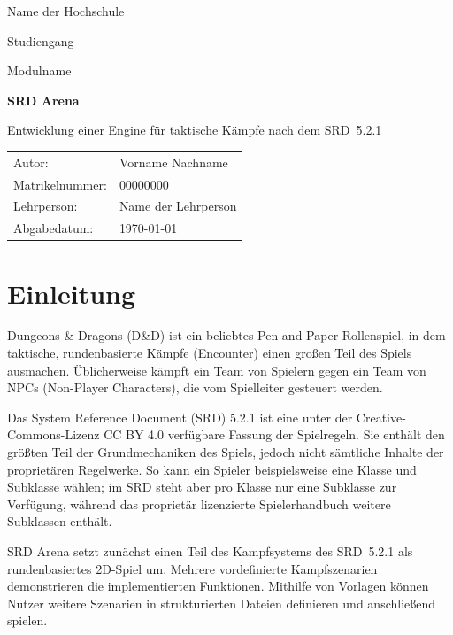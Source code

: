 \documentclass[
  12pt,
  a4paper,
  oneside,
  parskip=half,
  headings=normal
]{scrreprt}
\newcommand{\titel}{SRD Arena}
\newcommand{\untertitel}{Entwicklung einer Engine für taktische Kämpfe nach dem SRD~5.2.1}
\newcommand{\autor}{Vorname Nachname}
\newcommand{\matrikelnummer}{00000000}
\newcommand{\studiengang}{Studiengang}
\newcommand{\modul}{Modulname}
\newcommand{\dozent}{Name der Lehrperson}
\newcommand{\hochschule}{Name der Hochschule}
\newcommand{\abgabedatum}{\today}
\begin{document}
\begin{titlepage}
  \centering
  {\Large \hochschule\par}
  \vspace{1.5cm}
  {\large \studiengang\par}
  {\large \modul\par}
  \vfill
  {\Huge\bfseries \titel\par}
  \vspace{0.5cm}
  {\Large \untertitel\par}
  \vfill
  \begin{tabular}{ll}
    Autor: & \autor \\
    Matrikelnummer: & \matrikelnummer \\
    Lehrperson: & \dozent \\
    Abgabedatum: & \abgabedatum
  \end{tabular}
  \vfill
\end{titlepage}

\tableofcontents
\clearpage
{}

\chapter{Einleitung}

Dungeons \& Dragons (D\&D) ist ein beliebtes Pen-and-Paper-Rollenspiel, in
dem taktische, rundenbasierte Kämpfe (Encounter) einen großen Teil des Spiels
ausmachen. Üblicherweise kämpft ein Team von Spielern gegen ein Team von NPCs
(Non-Player Characters), die vom Spielleiter gesteuert werden.

Das System Reference Document (SRD) 5.2.1 ist eine unter der
Creative-Commons-Lizenz CC BY 4.0 verfügbare Fassung der Spielregeln. Sie
enthält den größten Teil der Grundmechaniken des Spiels, jedoch nicht sämtliche
Inhalte der proprietären Regelwerke. So kann ein Spieler beispielsweise eine
Klasse und Subklasse wählen; im SRD steht aber pro Klasse nur eine Subklasse
zur Verfügung, während das proprietär lizenzierte Spielerhandbuch weitere
Subklassen enthält.

SRD Arena setzt zunächst einen Teil des Kampfsystems des SRD~5.2.1 als
rundenbasiertes 2D-Spiel um. Mehrere vordefinierte Kampfszenarien demonstrieren
die implementierten Funktionen. Mithilfe von Vorlagen können Nutzer weitere
Szenarien in strukturierten Dateien definieren und anschließend spielen.
\end{document}
